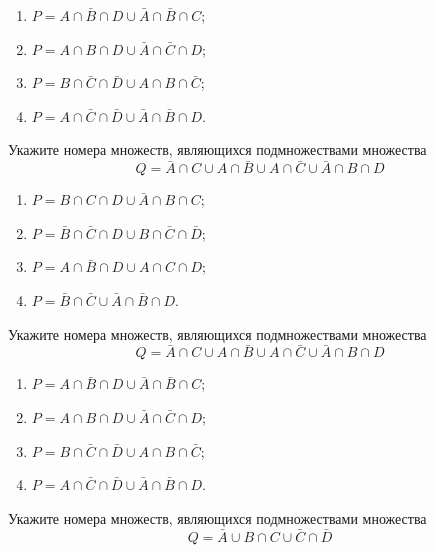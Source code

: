 \documentclass[10pt]{exam}
\begin{document}
\begin{questions}
\begin{enumerate}
	\renewcommand{\labelenumi}{\arabic{enumi})}
	\item $P = A \cap \bar{B} \cap D \cup \bar{A} \cap \bar{B} \cap C$;
	\item $P = A \cap B \cap D \cup \bar{A} \cap \bar{C} \cap D$;
	\item $P = B \cap \bar{C} \cap \bar{D} \cup A \cap B \cap \bar{C}$;
	\item $P = A \cap \bar{C} \cap \bar{D} \cup \bar{A} \cap \bar{B} \cap D$.
\end{enumerate}
\question
Укажите номера множеств, являющихся подмножествами множества
\begin{equation*}
	Q = \bar{A} \cap C \cup A \cap \bar{B} \cup A \cap \bar{C} \cup \bar{A} \cap B \cap D
\end{equation*}

\begin{enumerate}
	\renewcommand{\labelenumi}{\arabic{enumi})}
	\item $P = B \cap C \cap D \cup \bar{A} \cap B \cap C$;
	\item $P = \bar{B} \cap \bar{C} \cap D \cup B \cap \bar{C} \cap \bar{D}$;
	\item $P = A \cap \bar{B} \cap D \cup A \cap C \cap D$;
	\item $P = \bar{B} \cap \bar{C} \cup \bar{A} \cap \bar{B} \cap D$.
\end{enumerate}
\question
Укажите номера множеств, являющихся подмножествами множества
\begin{equation*}
	Q = \bar{A} \cap C \cup A \cap \bar{B} \cup A \cap \bar{C} \cup \bar{A} \cap B \cap D
\end{equation*}

\begin{enumerate}
	\renewcommand{\labelenumi}{\arabic{enumi})}
	\item $P = A \cap \bar{B} \cap D \cup \bar{A} \cap \bar{B} \cap C$;
	\item $P = A \cap B \cap D \cup \bar{A} \cap \bar{C} \cap D$;
	\item $P = B \cap \bar{C} \cap \bar{D} \cup A \cap B \cap \bar{C}$;
	\item $P = A \cap \bar{C} \cap \bar{D} \cup \bar{A} \cap \bar{B} \cap D$.
\end{enumerate}
\question
Укажите номера множеств, являющихся подмножествами множества
\begin{equation*}
	Q = \bar{A} \cup B \cap C \cup \bar{C} \cap \bar{D}
\end{equation*}


\end{questions}
\end{document}
